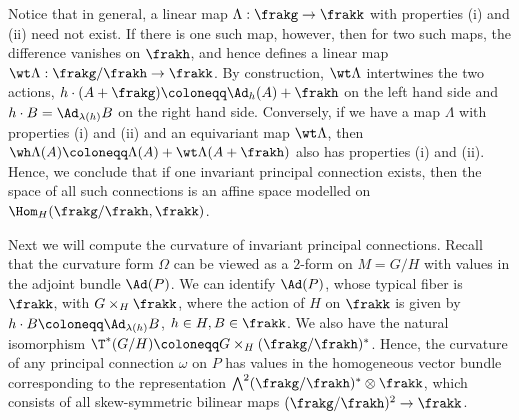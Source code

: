 \begin{rem}
    Notice that in general, a linear map $\Lambda:\frakg\to \frakk$ with properties (i) and (ii) need not exist. If there is one such map, however, then for two such maps, the difference vanishes on $\frakh$, and hence defines a linear map $\wt\Lambda:\frakg\slash\frakh\to \frakk$. By construction, $\wt\Lambda$ intertwines the two actions, $h\cdot (A+\frakg)\coloneqq \Ad_h(A)+\frakh$ on the left hand side and $h\cdot B=\Ad_{\lambda(h)}B$ on the right hand side. Conversely, if we have a map $\Lambda$ with properties (i) and (ii) and an equivariant map $\wt\Lambda$, then $\wh\Lambda(A)\coloneqq \Lambda(A)+\wt\Lambda(A+\frakh)$ also has properties (i) and (ii). Hence, we conclude that if one invariant principal connection exists, then the space of all such connections is an affine space modelled on $\Hom_H(\frakg\slash\frakh,\frakk)$.
\end{rem}



Next we will compute the curvature of invariant principal connections. Recall that the curvature form $\Omega$ can be viewed as a $2$-form on $M=G\slash H$ with values in the adjoint bundle $\Ad(P)$. We can identify $\Ad(P)$, whose typical fiber is $\frakk$, with $G\times_H \frakk$, where the action of $H$ on $\frakk$ is given by $h\cdot B\coloneqq \Ad_{\lambda(h)}B$, $h\in H, B\in\frakk$. We also have the natural isomorphism $\T^\ast(G\slash H)\coloneqq G\times_H (\frakg\slash\frakh)^\ast$. Hence, the curvature of any principal connection $\omega$ on $P$ has values in the homogeneous vector bundle corresponding to the representation $\bigwedge^2(\frakg\slash\frakh)^\ast\otimes\frakk$, which consists of all skew-symmetric bilinear maps $(\frakg\slash\frakh)^2\to\frakk$. 

